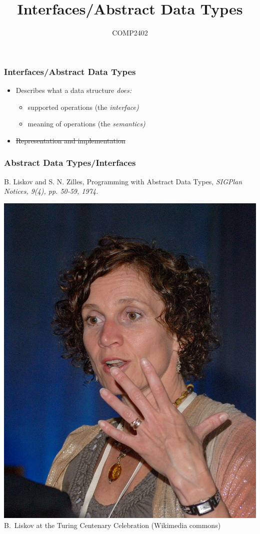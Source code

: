 \documentclass[aspectratio=169,xcolor=dvipsnames]{beamer}
\title{Interfaces/Abstract Data Types}
\author{COMP2402}
\date{}
\renewcommand{\emph}[1]{\itshape\color{blue}#1}
\begin{document}
\begin{frame}
  \titlepage
\end{frame}

\begin{frame}
  \frametitle{Interfaces/Abstract Data Types}
 
  \begin{itemize}
   \item<+->Describes what a data structure \emph{does}:
     \begin{itemize}
        \item<+->supported operations (the \emph{interface})
        \item<+->meaning of operations (the \emph{semantics})
     \end{itemize}
   \item<+-> \sout{Representation and implementation}
        \end{itemize}
\end{frame}

\begin{frame}
  \frametitle{Abstract Data Types/Interfaces}

   B. Liskov and S. N. Zilles, Programming with Abstract Data Types, \emph{SIGPlan Notices}, 9(4), pp. 50-59, 1974.\\
  \begin{center}
   \includegraphics[height=.6\textheight]{images/liskov}\\
   B.~Liskov at the Turing Centenary Celebration (Wikimedia commons)
  \end{center}
\end{frame}
\end{document}
